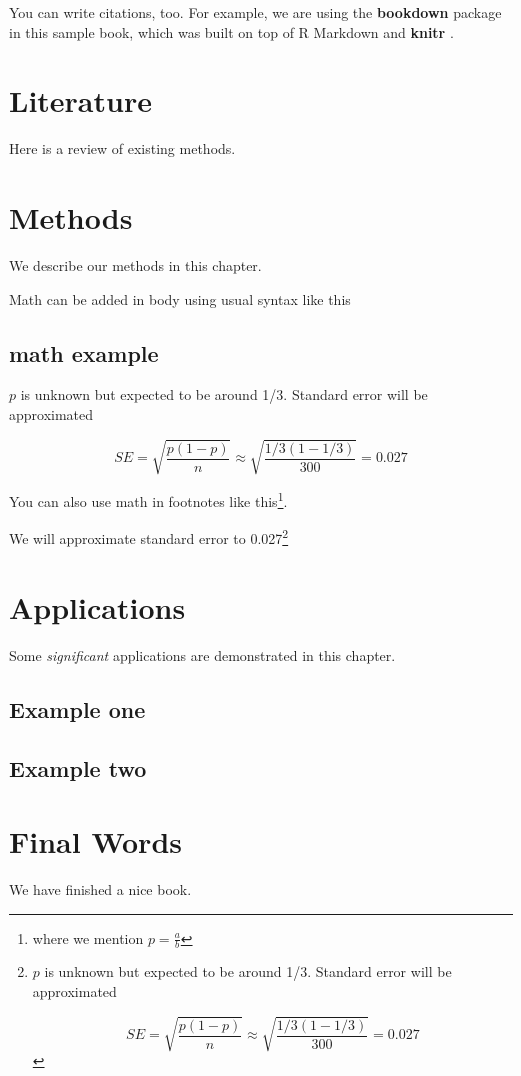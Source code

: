 \documentclass[
]{book}
\begin{document}
You can write citations, too. For example, we are using the \textbf{bookdown} package \citep{R-bookdown} in this sample book, which was built on top of R Markdown and \textbf{knitr} \citep{xie2015}.

\chapter{Literature}\label{literature}

Here is a review of existing methods.

\chapter{Methods}\label{methods}

We describe our methods in this chapter.

Math can be added in body using usual syntax like this

\section{math example}\label{math-example}

\(p\) is unknown but expected to be around 1/3. Standard error will be approximated

\[
SE = \sqrt{\frac{p(1-p)}{n}} \approx \sqrt{\frac{1/3 (1 - 1/3)} {300}} = 0.027
\]

You can also use math in footnotes like this\footnote{where we mention \(p = \frac{a}{b}\)}.

We will approximate standard error to 0.027\footnote{\(p\) is unknown but expected to be around 1/3. Standard error will be approximated

  \[
  SE = \sqrt{\frac{p(1-p)}{n}} \approx \sqrt{\frac{1/3 (1 - 1/3)} {300}} = 0.027
  \]}

\chapter{Applications}\label{applications}

Some \emph{significant} applications are demonstrated in this chapter.

\section{Example one}\label{example-one}

\section{Example two}\label{example-two}

\chapter{Final Words}\label{final-words}

We have finished a nice book.

  
\end{document}
